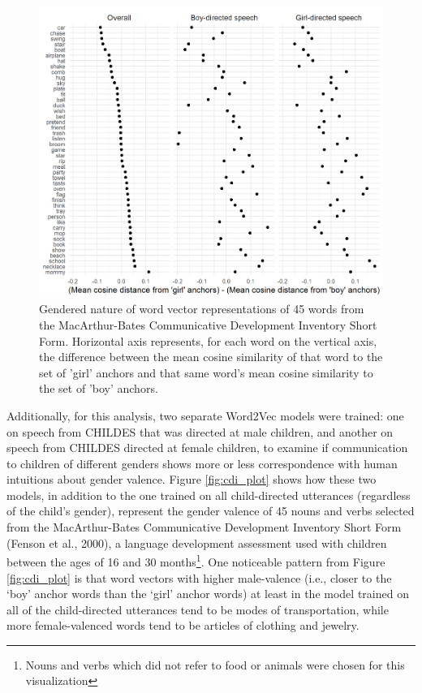 \documentclass[10pt, letterpaper]{article}
\newenvironment{CodeChunk}{}{}
\begin{document}
\begin{CodeChunk}
\begin{figure}[h]

{\centering \includegraphics{figs/cdiplot-1} 

}

\caption[Gendered nature of word vector representations of 45 words from the MacArthur-Bates Communicative Development Inventory Short Form]{Gendered nature of word vector representations of 45 words from the MacArthur-Bates Communicative Development Inventory Short Form. Horizontal axis represents, for each word on the vertical axis, the difference between the mean cosine similarity of that word to the set of 'girl' anchors and that same word's mean cosine similarity to the set of 'boy' anchors.}\label{fig:cdiplot}
\end{figure}
\end{CodeChunk}

Additionally, for this analysis, two separate Word2Vec models were
trained: one on speech from CHILDES that was directed at male children,
and another on speech from CHILDES directed at female children, to
examine if communication to children of different genders shows more or
less correspondence with human intuitions about gender valence. Figure
\ref{fig:cdi_plot} shows how these two models, in addition to the one
trained on all child-directed utterances (regardless of the child's
gender), represent the gender valence of 45 nouns and verbs selected
from the MacArthur-Bates Communicative Development Inventory Short Form
(Fenson et al., 2000), a language development assessment used with
children between the ages of 16 and 30
months\footnote{Nouns and verbs which did not refer to food or animals were chosen for this visualization}.
One noticeable pattern from Figure \ref{fig:cdi_plot} is that word
vectors with higher male-valence (i.e., closer to the `boy' anchor words
than the `girl' anchor words) at least in the model trained on all of
the child-directed utterances tend to be modes of transportation, while
more female-valenced words tend to be articles of clothing and jewelry.
\end{document}
